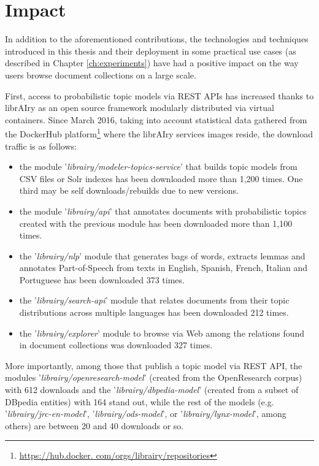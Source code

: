 \section{Impact}

In addition to the aforementioned contributions, the technologies and techniques introduced in this thesis and their deployment in some practical use cases (as described in Chapter \ref{ch:experiments}) have had a positive impact on the way users browse document collections on a large scale.

First, access to probabilistic topic models via REST APIs has increased thanks to librAIry as an open source framework modularly distributed via virtual containers. Since March 2016, taking into account statistical data gathered from the DockerHub platform\footnote{\url{https://hub.docker. com/orgs/librairy/repositories}} where the librAIry services images reside, the download traffic is as follows:
\begin{itemize}
\item the module '\textit{librairy/modeler-topics-service}' that builds topic models from CSV files or Solr indexes has been downloaded more than 1,200 times. One third may be self downloads/rebuilds due to new versions.
\item the module '\textit{librairy/api}' that annotates documents with probabilistic topics created with the previous module has been downloaded more than 1,100 times.
\item the '\textit{librairy/nlp}' module that generates bags of words, extracts lemmas and annotates Part-of-Speech from texts in English, Spanish, French, Italian and Portuguese has been downloaded 373 times.
\item the '\textit{librairy/search-api}' module that relates documents from their topic distributions across multiple languages has been downloaded 212 times.
\item the '\textit{librairy/explorer}' module to browse via Web among the relations found in document collections was downloaded 327 times.
\end{itemize}

More importantly, among those that publish a topic model via REST API, the modules '\textit{librairy/openresearch-model}' (created from the OpenResearch corpus) with 612 downloads and the '\textit{librairy/dbpedia-model}' (created from a subset of DBpedia entities) with 164 stand out, while the rest of the models (e.g. '\textit{librairy/jrc-en-model}', '\textit{librairy/ods-model}',  or '\textit{librairy/lynx-model}', among others) are between 20 and 40 downloads or so. 

